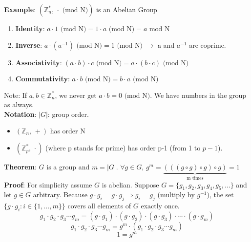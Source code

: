 \documentclass{scribe}
\begin{document}
\noindent\textbf{Example}: $(\mathbb{Z}_n^{*} \text{, } \cdot \text{ (mod N)})$ is an Abelian Group
\begin{enumerate}
    \item \textbf{Identity}: $ a \cdot 1 \text{ (mod N)} = 1 \cdot a \text{ (mod N)} = a \text{ mod N}$
    \item \textbf{Inverse}: $a \cdot (a^{-1}) \text{ (mod N)} = 1 \text{ (mod N)}$  $\rightarrow$  a and $a^{-1}$ are coprime.
    \item \textbf{Associativity}: $(a \cdot b)\cdot c \text{ (mod N)} = a \cdot (b \cdot c) \text{ (mod N)} $
    \item \textbf{Commutativity}: $a \cdot b \text{ (mod N)} = b \cdot a \text{ (mod N)}$
\end{enumerate}
\indent *Note: If $a,b \in \mathbb{Z}_n^{*}$, we never get $a \cdot b=0 \text{ (mod N)}$. We have numbers in the group as always.
\vspace{5mm}
\\\noindent\textbf{Notation}: $|G|$: group order. 
\begin{itemize}
    \item  $(\mathbb{Z}_n \text{, } + )$ has order N
    \item  $(\mathbb{Z}_p^{*} \text{, } \cdot )$ (where p stands for prime) has order p-1 (from 1 to $p-1$).
\end{itemize}
\vspace{8mm}

\noindent\textbf{Theorem}: $G$ is a group and $m=|G|$. $\forall g \in G$, $g^m = \underbrace{(((g \circ g) \circ g) \circ g)}_{\text{m times}}=1$
\\\noindent\textbf{Proof}: For simplicity assume $G$ is abelian. Suppose $G = \{g_1, g_2, g_3, g_4, g_5, \dots\}$ and let $g \in G$ arbitrary.
Because $g \cdot g_i = g \cdot g_j \Rightarrow g_i = g_j$ (multiply by $g^{-1}$), the set $\{g \cdot g_i : i \in \{1, \dots, m\}\}$ covers all elements of $G$ exactly once.
\[g_1 \cdot g_2 \cdot g_3 \cdots g_m = (g \cdot g_1) \cdot (g \cdot g_2) \cdot (g \cdot g_3) \cdot \cdots \cdot (g \cdot g_m)\]  
\[g_1 \cdot g_2 \cdot g_3 \cdots g_m = g^{m} \cdot (g_1 \cdot g_2 \cdot g_3 \cdots g_m)\]
\[ 1 = g^{m}\]
\vspace{5mm}
\end{document}
